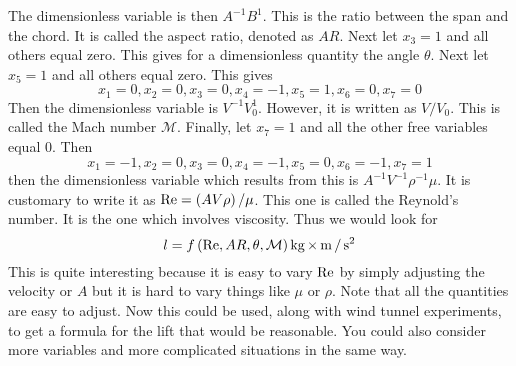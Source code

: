 The dimensionless variable is then $A^{-1}B^{1}$. This is the ratio between
the span and the chord. It is called the aspect ratio, denoted as $AR$. Next
let $x_{3}=1$ and all others equal zero. This gives for a dimensionless
quantity the angle $\theta $. Next let $x_{5}=1$ and all others equal zero.
This gives
\begin{equation*}
x_{1}=0,x_{2}=0,x_{3}=0,x_{4}=-1,x_{5}=1,x_{6}=0,x_{7}=0
\end{equation*}
Then the dimensionless variable is $V^{-1}V_{0}^{1}.$ However, it is written
as $V/V_{0}$. This is called the Mach number $\mathcal{M}$. Finally, let 
$x_{7}=1$ and all the other free variables equal 0. Then 
\begin{equation*}
x_{1}=-1,x_{2}=0,x_{3}=0,x_{4}=-1,x_{5}=0,x_{6}=-1,x_{7}=1
\end{equation*}
then the dimensionless variable which results from this is $A^{-1}V^{-1}\rho
^{-1}\mu .$ It is customary to write it as $\mbox{Re}=\left(AV\rho \right)
/\mu $. This one is called the Reynold's number. It is the one which
involves viscosity. Thus we would look for 
\begin{equation*}
l=f\left(\mbox{Re},AR,\theta ,\mathcal{M}\right) \mathop{\textrm{\rm kg}}\nolimits\times \mathop{\textrm{\rm m}}\nolimits/\mathop{\textrm{\rm s}}\nolimits ^{2}
\end{equation*}
This is quite interesting because it is easy to vary $\mbox{Re}$ by simply
adjusting the velocity or $A$ but it is hard to vary things like $\mu $ or $%
\rho $. Note that all the quantities are easy to adjust. Now this could be
used, along with wind tunnel experiments, to get a formula for the lift that
would be reasonable. You could also consider more variables and more
complicated situations in the same way.


